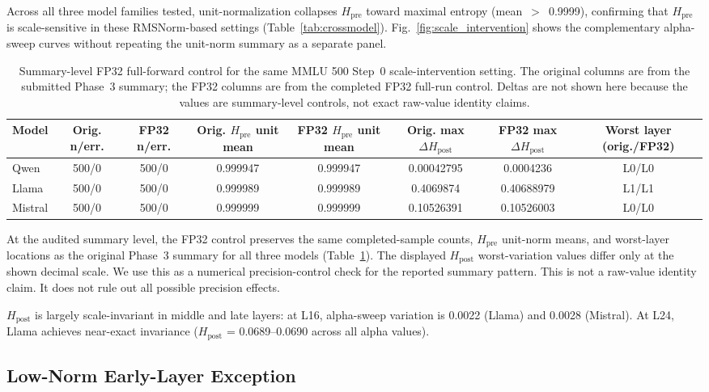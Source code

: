 \documentclass{ieeeaccess}
\newcommand{\Hpre}{H_{\text{pre}}}
\newcommand{\Hpost}{H_{\text{post}}}
\begin{document}
Across all three model families tested, unit-normalization collapses $\Hpre$ toward maximal entropy (mean~$>$~0.9999), confirming that $\Hpre$ is scale-sensitive in these RMSNorm-based settings (Table~\ref{tab:crossmodel}). Fig.~\ref{fig:scale_intervention} shows the complementary alpha-sweep curves without repeating the unit-norm summary as a separate panel.

\begin{table}[!t]
\centering
\caption{Summary-level FP32 full-forward control for the same MMLU 500 Step~0 scale-intervention setting. The original columns are from the submitted Phase~3 summary; the FP32 columns are from the completed FP32 full-run control. Deltas are not shown here because the values are summary-level controls, not exact raw-value identity claims.}
\label{tab:fp32_control}
\footnotesize
\setlength{\tabcolsep}{3pt}
\begin{tabular}{l c c c c c c c}
\toprule
Model & Orig. n/err. & FP32 n/err. & Orig. $\Hpre$ unit mean & FP32 $\Hpre$ unit mean & Orig. max $\Delta\Hpost$ & FP32 max $\Delta\Hpost$ & Worst layer (orig./FP32) \\
\midrule
Qwen & 500/0 & 500/0 & 0.999947 & 0.999947 & 0.00042795 & 0.0004236 & L0/L0 \\
Llama & 500/0 & 500/0 & 0.999989 & 0.999989 & 0.4069874 & 0.40688979 & L1/L1 \\
Mistral & 500/0 & 500/0 & 0.999999 & 0.999999 & 0.10526391 & 0.10526003 & L0/L0 \\
\bottomrule
\end{tabular}
\end{table}

At the audited summary level, the FP32 control preserves the same completed-sample counts, $\Hpre$ unit-norm means, and worst-layer locations as the original Phase~3 summary for all three models (Table~\ref{tab:fp32_control}). The displayed $\Hpost$ worst-variation values differ only at the shown decimal scale. We use this as a numerical precision-control check for the reported summary pattern. This is not a raw-value identity claim. It does not rule out all possible precision effects.

$\Hpost$ is largely scale-invariant in middle and late layers: at L16, alpha-sweep variation is 0.0022 (Llama) and 0.0028 (Mistral). At L24, Llama achieves near-exact invariance ($\Hpost$ = 0.0689--0.0690 across all alpha values).

\subsection{Low-Norm Early-Layer Exception}
\label{sec:epsilon}
\end{document}
